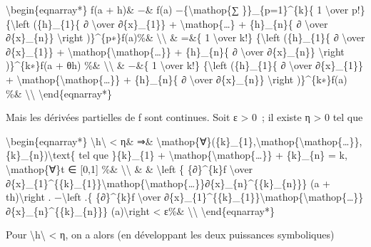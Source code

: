 \documentclass[]{article}
\begin{document}
\textbackslash{}begin\{eqnarray*\} f(a + h)\& −\& f(a)
−\{\textbackslash{}mathop\{∑ \}\}\_\{p=1\}\^{}\{k\}\{ 1
\textbackslash{}over p!\} \{\textbackslash{}left (\{h\}\_\{1\}\{ ∂
\textbackslash{}over ∂\{x\}\_\{1\}\} +
\textbackslash{}mathop\{\ldots{}\} + \{h\}\_\{n\}\{ ∂
\textbackslash{}over ∂\{x\}\_\{n\}\} \textbackslash{}right
)\}\^{}\{p∗\}f(a)\%\& \textbackslash{}\textbackslash{} \& =\&\{ 1
\textbackslash{}over k!\} \{\textbackslash{}left (\{h\}\_\{1\}\{ ∂
\textbackslash{}over ∂\{x\}\_\{1\}\} +
\textbackslash{}mathop\{\textbackslash{}mathop\{\ldots{}\}\} +
\{h\}\_\{n\}\{ ∂ \textbackslash{}over ∂\{x\}\_\{n\}\}
\textbackslash{}right )\}\^{}\{k∗\}f(a + θh) \%\&
\textbackslash{}\textbackslash{} \& −\&\{ 1 \textbackslash{}over k!\}
\{\textbackslash{}left (\{h\}\_\{1\}\{ ∂ \textbackslash{}over
∂\{x\}\_\{1\}\} +
\textbackslash{}mathop\{\textbackslash{}mathop\{\ldots{}\}\} +
\{h\}\_\{n\}\{ ∂ \textbackslash{}over ∂\{x\}\_\{n\}\}
\textbackslash{}right )\}\^{}\{k∗\}f(a) \%\&
\textbackslash{}\textbackslash{} \textbackslash{}end\{eqnarray*\}

Mais les dérivées partielles de f sont continues. Soit ε \textgreater{}
0~; il existe η \textgreater{} 0 tel que

\textbackslash{}begin\{eqnarray*\}
\textbackslash{}\textbar{}h\textbackslash{}\textbar{} \textless{} η\&
⇒\&
\textbackslash{}mathop\{∀\}(\{k\}\_\{1\},\textbackslash{}mathop\{\textbackslash{}mathop\{\ldots{}\}\},\{k\}\_\{n\})\textbackslash{}text\{
tel que \}\{k\}\_\{1\} +
\textbackslash{}mathop\{\textbackslash{}mathop\{\ldots{}\}\} +
\{k\}\_\{n\} = k, \textbackslash{}mathop\{∀\}t ∈ {[}0,1{]} \%\&
\textbackslash{}\textbackslash{} \& \& \textbackslash{}left \textbar{}\{
\{∂\}\^{}\{k\}f \textbackslash{}over
∂\{x\}\_\{1\}\^{}\{\{k\}\_\{1\}\}\textbackslash{}mathop\{\textbackslash{}mathop\{\ldots{}\}\}∂\{x\}\_\{n\}\^{}\{\{k\}\_\{n\}\}\}
(a + th)\textbackslash{}right . −\textbackslash{}left .\{
\{∂\}\^{}\{k\}f \textbackslash{}over
∂\{x\}\_\{1\}\^{}\{\{k\}\_\{1\}\}\textbackslash{}mathop\{\textbackslash{}mathop\{\ldots{}\}\}∂\{x\}\_\{n\}\^{}\{\{k\}\_\{n\}\}\}
(a)\textbackslash{}right \textbar{} \textless{} ε\%\&
\textbackslash{}\textbackslash{} \textbackslash{}end\{eqnarray*\}

Pour \textbackslash{}\textbar{}h\textbackslash{}\textbar{} \textless{}
η, on a alors (en développant les deux puissances symboliques)
\end{document}
